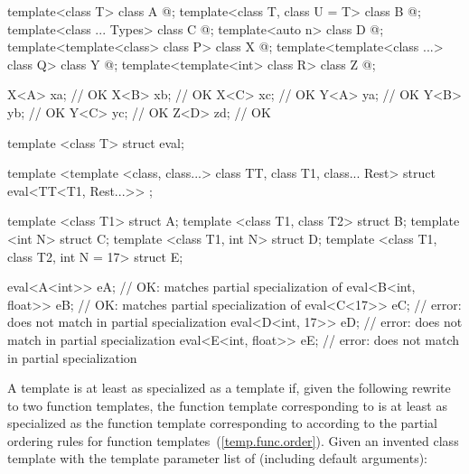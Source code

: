 \begin{example}
\begin{codeblock}
template<class T> class A { @\commentellip@ };
template<class T, class U = T> class B { @\commentellip@ };
template<class ... Types> class C { @\commentellip@ };
template<auto n> class D { @\commentellip@ };
template<template<class> class P> class X { @\commentellip@ };
template<template<class ...> class Q> class Y { @\commentellip@ };
template<template<int> class R> class Z { @\commentellip@ };

X<A> xa;            // OK
X<B> xb;            // OK
X<C> xc;            // OK
Y<A> ya;            // OK
Y<B> yb;            // OK
Y<C> yc;            // OK
Z<D> zd;            // OK
\end{codeblock}
\end{example}

\begin{example}
\begin{codeblock}
template <class T> struct eval;

template <template <class, class...> class TT, class T1, class... Rest>
struct eval<TT<T1, Rest...>> { };

template <class T1> struct A;
template <class T1, class T2> struct B;
template <int N> struct C;
template <class T1, int N> struct D;
template <class T1, class T2, int N = 17> struct E;

eval<A<int>> eA;                // OK: matches partial specialization of 
eval<B<int, float>> eB;         // OK: matches partial specialization of 
eval<C<17>> eC;                 // error:  does not match  in partial specialization
eval<D<int, 17>> eD;            // error:  does not match  in partial specialization
eval<E<int, float>> eE;         // error:  does not match  in partial specialization
\end{codeblock}
\end{example}

\pnum
A template   is
at least as specialized as a template  
if, given the following rewrite to two function templates,
the function template corresponding to 
is at least as specialized as
the function template corresponding to 
according to the partial ordering rules
for function templates~(\ref{temp.func.order}).
Given an invented class template 
with the template parameter list of  (including default arguments):

